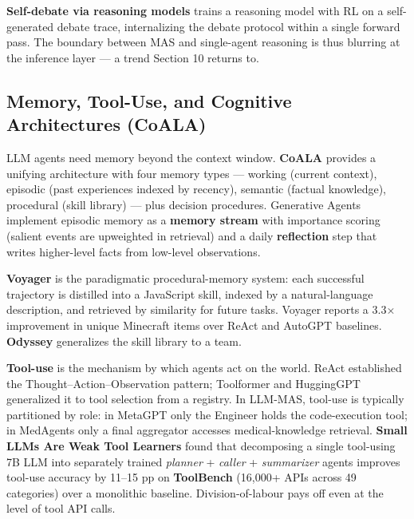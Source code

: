 \documentclass{article}
\begin{document}
\textbf{Self-debate via reasoning models} \citep{liu20262026} trains a reasoning model with RL on a self-generated debate trace, internalizing the debate protocol within a single forward pass. The boundary between MAS and single-agent reasoning is thus blurring at the inference layer --- a trend Section 10 returns to.

\subsection{Memory, Tool-Use, and Cognitive Architectures (CoALA)}\label{memory-tool-use-and-cognitive-architectures-coala}

LLM agents need memory beyond the context window. \textbf{CoALA} \citep{sumers2023cognitivearchitect} provides a unifying architecture with four memory types --- working (current context), episodic (past experiences indexed by recency), semantic (factual knowledge), procedural (skill library) --- plus decision procedures. Generative Agents \citep{park2023generativeagentsin} implement episodic memory as a \textbf{memory stream} with importance scoring (salient events are upweighted in retrieval) and a daily \textbf{reflection} step that writes higher-level facts from low-level observations.

\textbf{Voyager} \citep{wang2023voyageranopenended} is the paradigmatic procedural-memory system: each successful trajectory is distilled into a JavaScript skill, indexed by a natural-language description, and retrieved by similarity for future tasks. Voyager reports a 3.3× improvement in unique Minecraft items over ReAct and AutoGPT baselines. \textbf{Odyssey} \citep{liu20242024} generalizes the skill library to a team.

\textbf{Tool-use} is the mechanism by which agents act on the world. ReAct established the Thought--Action--Observation pattern; Toolformer and HuggingGPT generalized it to tool selection from a registry. In LLM-MAS, tool-use is typically partitioned by role: in MetaGPT only the Engineer holds the code-execution tool; in MedAgents only a final aggregator accesses medical-knowledge retrieval. \textbf{Small LLMs Are Weak Tool Learners} \citep{shen2024smallllmsareweakto} found that decomposing a single tool-using 7B LLM into separately trained \emph{planner} + \emph{caller} + \emph{summarizer} agents improves tool-use accuracy by 11--15 pp on \textbf{ToolBench} (16,000+ APIs across 49 categories) over a monolithic baseline. Division-of-labour pays off even at the level of tool API calls.
\end{document}
